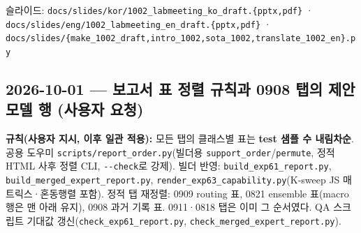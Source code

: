 \par\noindent \textbullet\enspace 슬라이드: \texttt{docs/\allowbreak{}\allowbreak{}sli\allowbreak{}des/\allowbreak{}\allowbreak{}kor/\allowbreak{}\allowbreak{}1002\_\allowbreak{}\allowbreak{}lab\allowbreak{}meeting\_\allowbreak{}\allowbreak{}ko\_\allowbreak{}\allowbreak{}draft\allowbreak{}.\allowbreak{}\{\allowbreak{}pptx,\allowbreak{}p\allowbreak{}df\}\allowbreak{}} · \texttt{docs/\allowbreak{}\allowbreak{}sli\allowbreak{}des/\allowbreak{}\allowbreak{}eng/\allowbreak{}\allowbreak{}1002\_\allowbreak{}\allowbreak{}lab\allowbreak{}meeting\_\allowbreak{}\allowbreak{}en\_\allowbreak{}\allowbreak{}draft\allowbreak{}.\allowbreak{}\{\allowbreak{}pptx,\allowbreak{}p\allowbreak{}df\}\allowbreak{}} · \texttt{docs/\allowbreak{}\allowbreak{}sli\allowbreak{}des/\allowbreak{}\allowbreak{}\{\allowbreak{}mak\allowbreak{}e\_\allowbreak{}\allowbreak{}1002\_\allowbreak{}\allowbreak{}d\allowbreak{}raft,\allowbreak{}int\allowbreak{}ro\_\allowbreak{}\allowbreak{}1002,\allowbreak{}sota\_\allowbreak{}\allowbreak{}100\allowbreak{}2,\allowbreak{}transl\allowbreak{}ate\_\allowbreak{}\allowbreak{}1002\allowbreak{}\_\allowbreak{}\allowbreak{}en\}\allowbreak{}.\allowbreak{}py}


\subsection{2026-10-01 — 보고서 표 정렬 규칙과 0908 탭의 제안 모델 행 (사용자 요청)}
\par\noindent \textbullet\enspace \textbf{규칙(사용자 지시, 이후 일관 적용):} 모든 탭의 클래스별 표는 \textbf{test 샘플 수 내림차순}. 공용 도우미 \texttt{scripts/\allowbreak{}\allowbreak{}report\_\allowbreak{}\allowbreak{}o\allowbreak{}rder.\allowbreak{}py}(빌더용 \texttt{support\_\allowbreak{}\allowbreak{}order}/\allowbreak{}\texttt{permute}, 정적 HTML 사후 정렬 CLI, \texttt{-\allowbreak{}-\allowbreak{}check}로 강제). 빌더 반영: \texttt{build\_\allowbreak{}\allowbreak{}ex\allowbreak{}p61\_\allowbreak{}\allowbreak{}repo\allowbreak{}rt.\allowbreak{}py}, \texttt{build\_\allowbreak{}\allowbreak{}me\allowbreak{}rged\_\allowbreak{}\allowbreak{}exp\allowbreak{}ert\_\allowbreak{}\allowbreak{}repo\allowbreak{}rt.\allowbreak{}py}, \texttt{render\_\allowbreak{}\allowbreak{}e\allowbreak{}xp63\_\allowbreak{}\allowbreak{}cap\allowbreak{}ability.\allowbreak{}py}(K-sweep JS 매트릭스·혼동행렬 포함). 정적 탭 재정렬: 0909 routing 표, 0821 ensemble 표(macro 행은 맨 아래 유지), 0908 과거 기록 표. 0911·0818 탭은 이미 그 순서였다. QA 스크립트 기대값 갱신(\texttt{check\_\allowbreak{}\allowbreak{}ex\allowbreak{}p61\_\allowbreak{}\allowbreak{}repo\allowbreak{}rt.\allowbreak{}py}, \texttt{check\_\allowbreak{}\allowbreak{}me\allowbreak{}rged\_\allowbreak{}\allowbreak{}exp\allowbreak{}ert\_\allowbreak{}\allowbreak{}repo\allowbreak{}rt.\allowbreak{}py}).


